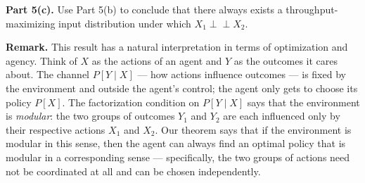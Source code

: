 \documentclass[8pt]{article}
\begin{document}
\medskip
\noindent
\textbf{Part 5(c).} Use Part 5(b) to conclude that there always exists a
throughput-maximizing input distribution under which $X_1 \perp\!\!\!\perp X_2$.

\medskip
\noindent
\textbf{Remark.} This result has a natural interpretation in terms of optimization and agency. Think of $X$ as the actions of an agent and $Y$ as the outcomes it cares about. The channel $P[Y \mid X]$ — how actions influence outcomes — is fixed by the environment and outside the agent's control; the agent only gets to choose its policy $P[X]$. The factorization condition on $P[Y \mid X]$ says that the environment is \emph{modular}: the two groups of outcomes $Y_1$ and $Y_2$ are each influenced only by their respective actions $X_1$ and $X_2$. Our theorem says that if the environment is modular in this sense, then the agent can always find an optimal policy that is modular in a corresponding sense --- specifically, the two groups of actions need not be coordinated at all and can be chosen independently.
\end{document}
